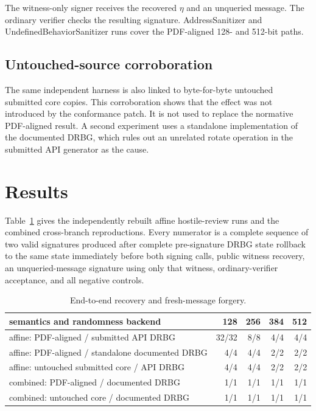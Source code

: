 \documentclass[11pt,a4paper]{article}
\begin{document}
The witness-only signer receives the recovered $\eta$ and an unqueried message.
The ordinary verifier checks the resulting signature.  AddressSanitizer and
UndefinedBehaviorSanitizer runs cover the PDF-aligned 128- and 512-bit paths.

\subsection{Untouched-source corroboration}

The same independent harness is also linked to byte-for-byte untouched
submitted core copies.  This corroboration shows that the effect was not
introduced by the conformance patch.  It is not used to replace the normative
PDF-aligned result.  A second experiment uses a standalone implementation of
the documented DRBG, which rules out an unrelated rotate operation in the
submitted API generator as the cause.

\section{Results}

Table~\ref{tab:results} gives the independently rebuilt affine hostile-review
runs and the combined cross-branch reproductions.  Every numerator is a
complete sequence of two valid signatures produced after complete
pre-signature DRBG state rollback to the same state immediately before both
signing calls, public witness recovery, an unqueried-message
signature using only that witness, ordinary-verifier acceptance, and all
negative controls.

\begin{table}[ht]
\centering
\small
\caption{End-to-end recovery and fresh-message forgery.}
\label{tab:results}
\begin{tabular}{lrrrr}
\toprule
semantics and randomness backend & 128 & 256 & 384 & 512\\
\midrule
affine: PDF-aligned / submitted API DRBG & 32/32 & 8/8 & 4/4 & 4/4\\
affine: PDF-aligned / standalone documented DRBG & 4/4 & 4/4 & 2/2 & 2/2\\
affine: untouched submitted core / API DRBG & 4/4 & 4/4 & 2/2 & 2/2\\
combined: PDF-aligned / documented DRBG & 1/1 & 1/1 & 1/1 & 1/1\\
combined: untouched core / documented DRBG & 1/1 & 1/1 & 1/1 & 1/1\\
\bottomrule
\end{tabular}
\end{table}
\end{document}
